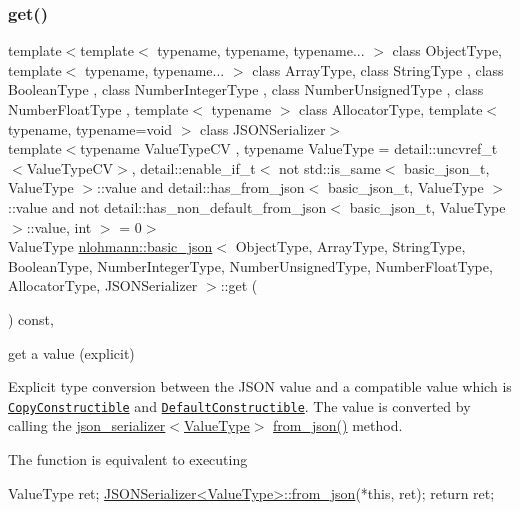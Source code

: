 \subsubsection{\texorpdfstring{get()}{get()}\hspace{0.1cm}{\footnotesize\ttfamily [2/5]}}
{\footnotesize\ttfamily template$<$template$<$ typename, typename, typename... $>$ class Object\+Type, template$<$ typename, typename... $>$ class Array\+Type, class String\+Type , class Boolean\+Type , class Number\+Integer\+Type , class Number\+Unsigned\+Type , class Number\+Float\+Type , template$<$ typename $>$ class Allocator\+Type, template$<$ typename, typename=void $>$ class J\+S\+O\+N\+Serializer$>$ \\
template$<$typename Value\+Type\+CV , typename Value\+Type  = detail\+::uncvref\+\_\+t$<$\+Value\+Type\+C\+V$>$, detail\+::enable\+\_\+if\+\_\+t$<$ not std\+::is\+\_\+same$<$ basic\+\_\+json\+\_\+t, Value\+Type $>$\+::value and detail\+::has\+\_\+from\+\_\+json$<$ basic\+\_\+json\+\_\+t, Value\+Type $>$\+::value and not detail\+::has\+\_\+non\+\_\+default\+\_\+from\+\_\+json$<$ basic\+\_\+json\+\_\+t, Value\+Type $>$\+::value, int $>$  = 0$>$ \\
Value\+Type \hyperlink{classnlohmann_1_1basic__json}{nlohmann\+::basic\+\_\+json}$<$ Object\+Type, Array\+Type, String\+Type, Boolean\+Type, Number\+Integer\+Type, Number\+Unsigned\+Type, Number\+Float\+Type, Allocator\+Type, J\+S\+O\+N\+Serializer $>$\+::get (\begin{DoxyParamCaption}{ }\end{DoxyParamCaption}) const\hspace{0.3cm}{\ttfamily [inline]}, {\ttfamily [noexcept]}}



get a value (explicit) 

Explicit type conversion between the J\+S\+ON value and a compatible value which is \href{http://en.cppreference.com/w/cpp/concept/CopyConstructible}{\tt Copy\+Constructible} and \href{http://en.cppreference.com/w/cpp/concept/DefaultConstructible}{\tt Default\+Constructible}. The value is converted by calling the \hyperlink{classnlohmann_1_1basic__json_a7768841baaaa7a21098a401c932efaff}{json\+\_\+serializer$<$\+Value\+Type$>$} {\ttfamily \hyperlink{namespacenlohmann_1_1detail_a8b99ec9b29f3f20a18fc4281fb784e49}{from\+\_\+json()}} method.

The function is equivalent to executing 
\begin{DoxyCode}
ValueType ret;
\hyperlink{namespacenlohmann_1_1anonymous__namespace_02json_8hpp_03_a69afe041fa2aeac2239b65ae88b64af8}{JSONSerializer<ValueType>::from\_json}(*\textcolor{keyword}{this}, ret);
\textcolor{keywordflow}{return} ret;
\end{DoxyCode}



